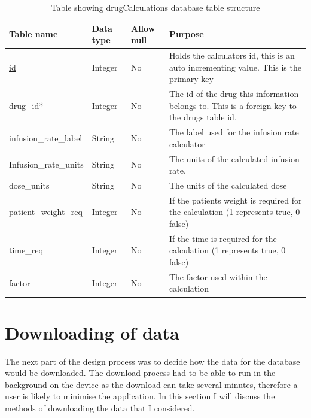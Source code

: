 \begin{center}
\begin{longtable}{|l|l|l|p{7cm}|}
\caption{Table showing drugCalculations database table structure}\tabularnewline
\hline
\textbf{Table name}   & \textbf{Data type} & \textbf{Allow null} & \textbf{Purpose} \\ \hline
\uline{id}                    & Integer            & No                  & Holds the calculators id, this is an auto incrementing value. This is the primary key        \\ \hline
drug\_id*             & Integer            & No                  & The id of the drug this information belongs to. This is a foreign key to the drugs table id. \\ \hline
infusion\_rate\_label & String             & No                  & The label used for the infusion rate calculator                                              \\ \hline
Infusion\_rate\_units & String             & No                  & The units of the calculated infusion rate.                                                   \\ \hline
dose\_units           & String             & No                  & The units of the calculated dose                                                             \\ \hline
patient\_weight\_req  & Integer            & No                  & If the patients weight is required for the calculation (1 represents true, 0 false)          \\ \hline
time\_req             & Integer            & No                  & If the time is required for the calculation (1 represents true, 0 false)                     \\ \hline
factor                & Integer            & No                  & The factor used within the calculation                                                       \\ \hline
\end{longtable}
\end{center}

\section{Downloading of data}

The next part of the design process was to decide how the data for the database would be downloaded. The download process had to be able to run in the background on the device as the download can take several minutes, therefore a user is likely to minimise the application. In this section I will discuss the methods of downloading the data that I considered.

